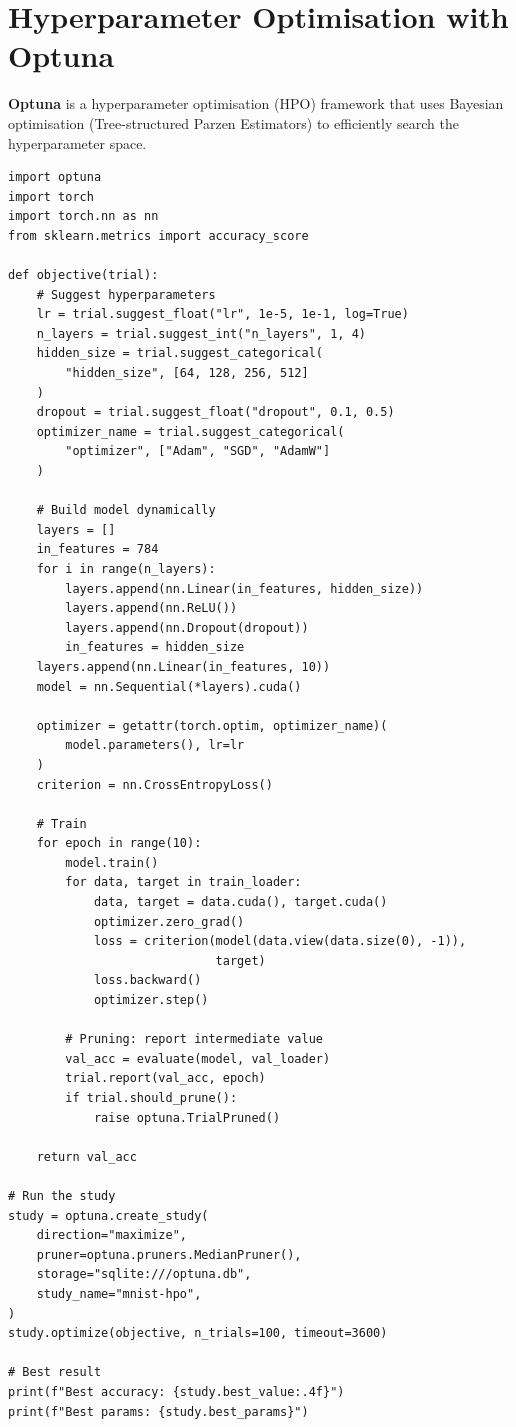 \section{Hyperparameter Optimisation with Optuna}
\label{sec:optuna}

\textbf{Optuna} is a hyperparameter optimisation (HPO)
framework that uses Bayesian optimisation (Tree-structured Parzen
Estimators) to efficiently search the hyperparameter space.

\begin{codeblock}[title=\textbf{Optuna hyperparameter search}]
\begin{verbatim}
import optuna
import torch
import torch.nn as nn
from sklearn.metrics import accuracy_score

def objective(trial):
    # Suggest hyperparameters
    lr = trial.suggest_float("lr", 1e-5, 1e-1, log=True)
    n_layers = trial.suggest_int("n_layers", 1, 4)
    hidden_size = trial.suggest_categorical(
        "hidden_size", [64, 128, 256, 512]
    )
    dropout = trial.suggest_float("dropout", 0.1, 0.5)
    optimizer_name = trial.suggest_categorical(
        "optimizer", ["Adam", "SGD", "AdamW"]
    )

    # Build model dynamically
    layers = []
    in_features = 784
    for i in range(n_layers):
        layers.append(nn.Linear(in_features, hidden_size))
        layers.append(nn.ReLU())
        layers.append(nn.Dropout(dropout))
        in_features = hidden_size
    layers.append(nn.Linear(in_features, 10))
    model = nn.Sequential(*layers).cuda()

    optimizer = getattr(torch.optim, optimizer_name)(
        model.parameters(), lr=lr
    )
    criterion = nn.CrossEntropyLoss()

    # Train
    for epoch in range(10):
        model.train()
        for data, target in train_loader:
            data, target = data.cuda(), target.cuda()
            optimizer.zero_grad()
            loss = criterion(model(data.view(data.size(0), -1)),
                             target)
            loss.backward()
            optimizer.step()

        # Pruning: report intermediate value
        val_acc = evaluate(model, val_loader)
        trial.report(val_acc, epoch)
        if trial.should_prune():
            raise optuna.TrialPruned()

    return val_acc

# Run the study
study = optuna.create_study(
    direction="maximize",
    pruner=optuna.pruners.MedianPruner(),
    storage="sqlite:///optuna.db",
    study_name="mnist-hpo",
)
study.optimize(objective, n_trials=100, timeout=3600)

# Best result
print(f"Best accuracy: {study.best_value:.4f}")
print(f"Best params: {study.best_params}")
\end{verbatim}
\end{codeblock}


